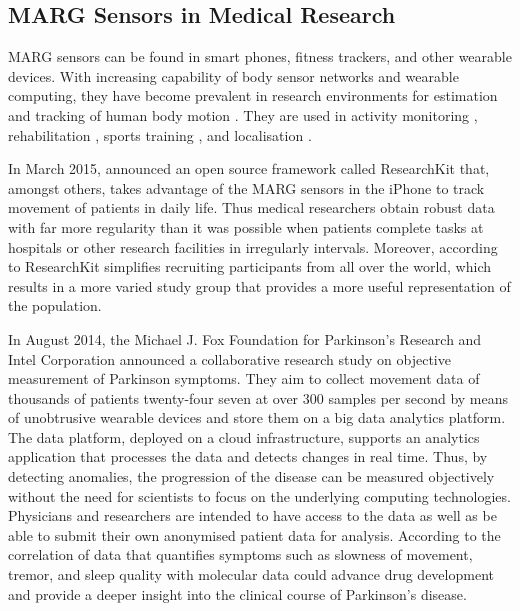 \subsection{MARG Sensors in Medical Research}\label{sec:MARG_sensors_medical}

MARG sensors can be found in smart phones, fitness trackers, and other wearable devices. With increasing capability of body sensor networks and wearable computing, they have become prevalent in research environments for estimation and tracking of human body motion \cite{bennett_motion_2014}. They are used in activity monitoring \cite{veltink_detection_96}\cite{najafi_ambulatory_03}\cite{ermes_sports_08}, rehabilitation \cite{giggins_rehabilitation_13}\cite{lupinski_ligament_11}, sports training \cite{bonnet_squat_13}\cite{ermes_sports_08}, and localisation \cite{hoflinger_localization_13}\cite{Bennett_distance_13}.

In March 2015, \citeauthor{Apple_2015} announced an open source framework called ResearchKit \cite{Apple_2015} that, amongst others, takes advantage of the MARG sensors in the iPhone to track movement of patients in daily life. Thus medical researchers obtain robust data with far more regularity than it was possible when patients complete tasks at hospitals or other research facilities in irregularly intervals. Moreover, according to \citeauthor{Apple_2015} ResearchKit simplifies recruiting participants from all over the world, which results in a more varied study group that provides a more useful representation of the population.

In August 2014, the Michael J. Fox Foundation for Parkinson’s Research and Intel Corporation \cite{Intel_2013} announced a collaborative research study on objective measurement of Parkinson symptoms. They aim to collect movement data of thousands of patients twenty-four seven at over 300 samples per second by means of unobtrusive wearable devices and store them on a big data analytics platform. The data platform, deployed on a cloud infrastructure, supports an analytics application that processes the data and detects changes in real time. Thus, by detecting anomalies, the progression of the disease can be measured objectively without the need for scientists to focus on the underlying computing technologies. Physicians and researchers are intended to have access to the data as well as be able to submit their own anonymised patient data for analysis. According to \cite{Intel_2013} the correlation of data that quantifies symptoms such as slowness of movement, tremor, and sleep quality with molecular data could advance drug development and provide a deeper insight into the clinical course of Parkinson's disease.



